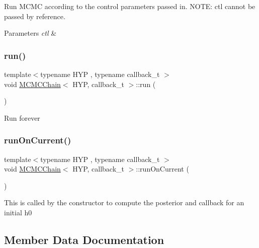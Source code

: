 Run M\+C\+MC according to the control parameters passed in. N\+O\+TE\+: ctl cannot be passed by reference. 
\begin{DoxyParams}{Parameters}
{\em ctl} & \\
\hline
\end{DoxyParams}
\mbox{\label{class_m_c_m_c_chain_ae59e07a79da1bf56b01429efcb9fb312}} 
\subsubsection{\texorpdfstring{run()}{run()}\hspace{0.1cm}{\footnotesize\ttfamily [2/2]}}
{\footnotesize\ttfamily template$<$typename H\+YP , typename callback\+\_\+t $>$ \\
void \hyperlink{class_m_c_m_c_chain}{M\+C\+M\+C\+Chain}$<$ H\+YP, callback\+\_\+t $>$\+::run (\begin{DoxyParamCaption}{ }\end{DoxyParamCaption})\hspace{0.3cm}{\ttfamily [inline]}}

Run forever\mbox{\label{class_m_c_m_c_chain_a4214114e0ef4adcd4badfe1440693190}} 
\subsubsection{\texorpdfstring{run\+On\+Current()}{runOnCurrent()}}
{\footnotesize\ttfamily template$<$typename H\+YP , typename callback\+\_\+t $>$ \\
void \hyperlink{class_m_c_m_c_chain}{M\+C\+M\+C\+Chain}$<$ H\+YP, callback\+\_\+t $>$\+::run\+On\+Current (\begin{DoxyParamCaption}{ }\end{DoxyParamCaption})\hspace{0.3cm}{\ttfamily [inline]}}

This is called by the constructor to compute the posterior and callback for an initial h0

\subsection{Member Data Documentation}
\mbox{\label{class_m_c_m_c_chain_ae1597e42074b2efb93ace3e40f1f7a45}} 
